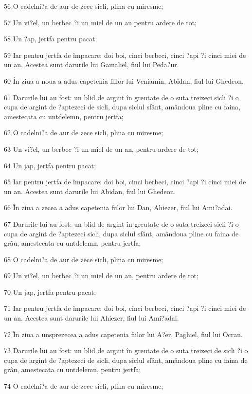\par 56 O cadelni?a de aur de zece sicli, plina cu miresme;
\par 57 Un vi?el, un berbec ?i un miel de un an pentru ardere de tot;
\par 58 Un ?ap, jertfa pentru pacat;
\par 59 Iar pentru jertfa de împacare: doi boi, cinci berbeci, cinci ?api ?i cinci miei de un an. Acestea sunt darurile lui Gamaliel, fiul lui Peda?ur.
\par 60 În ziua a noua a adus capetenia fiilor lui Veniamin, Abidan, fiul lui Ghedeon.
\par 61 Darurile lui au fost: un blid de argint în greutate de o suta treizeci sicli ?i o cupa de argint de ?aptezeci de sicli, dupa siclul sfânt, amândoua pline cu faina, amestecata cu untdelemn, pentru jertfa;
\par 62 O cadelni?a de aur de zece sicli, plina cu miresme;
\par 63 Un vi?el, un berbec ?i un miel de un an, pentru ardere de tot;
\par 64 Un jap, jertfa pentru pacat;
\par 65 Iar pentru jertfa de împacare: doi boi, cinci berbeci, cinci ?api ?i cinci miei de un an. Acestea sunt darurile lui Abidan, fiul lui Ghedeon.
\par 66 În ziua a zecea a adus capetenia fiilor lui Dan, Ahiezer, fiul lui Ami?adai.
\par 67 Darurile lui au fost: un blid de argint în greutate de o suta treizeci sicli ?i o cupa de argint de ?aptezeci sicli, dupa siclul sfânt, amândoua pline cu faina de grâu, amestecata cu untdelemn, pentru jertfa;
\par 68 O cadelni?a de aur de zece sicli, plina cu miresme;
\par 69 Un vi?el, un berbec ?i un miel de un an, pentru ardere de tot;
\par 70 Un jap, jertfa pentru pacat;
\par 71 Iar pentru jertfa de împacare: doi boi, cinci berbeci, cinci ?api ?i cinci miei de un an. Acestea sunt darurile lui Ahiezer, fiul lui Ami?adai.
\par 72 În ziua a unsprezecea a adus capetenia fiilor lui A?er, Paghiel, fiul lui Ocran.
\par 73 Darurile lui au fost: un blid de argint în greutate de o suta treizeci de sicli ?i o cupa de argint de ?aptezeci de sicli, dupa siclul sfânt, amândoua pline cu faina de grâu, amestecata cu untdelemn, pentru jertfa;
\par 74 O cadelni?a de aur de zece sicli, plina cu miresme;
